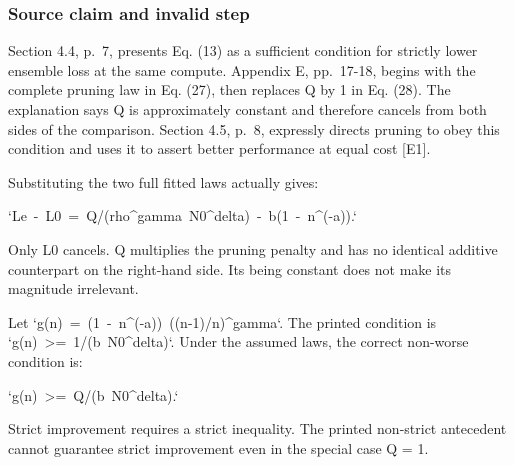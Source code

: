 \documentclass[10pt]{article}
\begin{document}
\subsubsection*{Source claim and invalid step}
Section 4.4, p. 7, presents Eq. (13) as a sufficient condition for strictly lower ensemble loss at the same compute. Appendix E, pp. 17-18, begins with the complete pruning law in Eq. (27), then replaces Q by 1 in Eq. (28). The explanation says Q is approximately constant and therefore cancels from both sides of the comparison. Section 4.5, p. 8, expressly directs pruning to obey this condition and uses it to assert better performance at equal cost [E1].\par
Substituting the two full fitted laws actually gives:\par
`Le - L0 = Q/(rho\textasciicircum{}gamma N0\textasciicircum{}delta) - b(1 - n\textasciicircum{}(-a)).`\par
Only L0 cancels. Q multiplies the pruning penalty and has no identical additive counterpart on the right-hand side. Its being constant does not make its magnitude irrelevant.\par
Let `g(n) = (1 - n\textasciicircum{}(-a)) ((n-1)/n)\textasciicircum{}gamma`. The printed condition is `g(n) >= 1/(b N0\textasciicircum{}delta)`. Under the assumed laws, the correct non-worse condition is:\par
`g(n) >= Q/(b N0\textasciicircum{}delta).`\par
Strict improvement requires a strict inequality. The printed non-strict antecedent cannot guarantee strict improvement even in the special case Q = 1.\par
\end{document}
